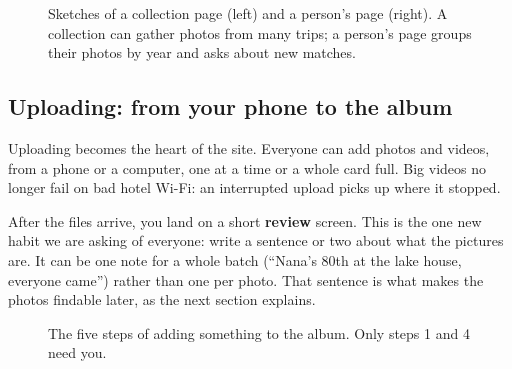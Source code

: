 \documentclass[11pt,a4paper]{article}
\begin{document}
\begin{figure}[H]
  \caption{Sketches of a collection page (left) and a person's page (right). A collection can gather photos from many trips; a person's page groups their photos by year and asks about new matches.}
\end{figure}

\subsection{Uploading: from your phone to the album}

Uploading becomes the heart of the site. Everyone can add photos and videos, from a phone or a computer, one at a time or a whole card full. Big videos no longer fail on bad hotel Wi-Fi: an interrupted upload picks up where it stopped.

After the files arrive, you land on a short \textbf{review} screen. This is the one new habit we are asking of everyone: write a sentence or two about what the pictures are. It can be one note for a whole batch (``Nana's 80th at the lake house, everyone came'') rather than one per photo. That sentence is what makes the photos findable later, as the next section explains.

\begin{figure}[H]
  \centering
  \caption{The five steps of adding something to the album. Only steps 1 and 4 need you.}
\end{figure}
\end{document}
